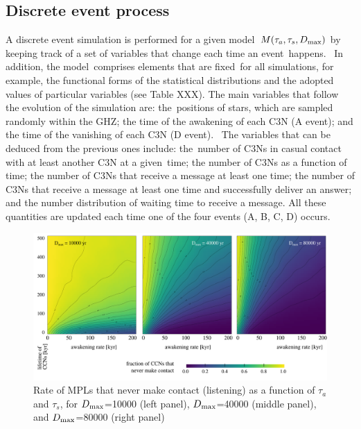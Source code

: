 \documentclass[crop]{CSLB}
\newcommand{\ceti}{C3N}
\newcommand{\cetis}{C3Ns}
\begin{document}
     



\subsection{Discrete event process}

A discrete event simulation is performed for a given model $M(\tau_a,
\tau_s, D_{\rm max})$ by keeping track of a set of variables that change each time an event happens. 
%
In addition, the model comprises elements that are fixed for all simulations, for example, the functional forms of the statistical distributions and the adopted values of particular variables (see Table XXX).
%
The main variables that follow the evolution of the simulation are: the positions of stars, which are sampled randomly within the GHZ; the time of the awakening of each \ceti{} (A event); and the time of the vanishing of each \ceti{} (D event). 
%
The variables that can be deduced from the previous ones include: the number of \cetis{} in casual contact with at least another \ceti{} at a given time; the number of \cetis{} as a function of time; the number of \cetis{} that receive a message at least one time; the number of \cetis{} that receive a message at least one time and successfully deliver an answer; and the number distribution of waiting time to receive a message.
%
All these quantities are updated each time one of the four events (A, B, C, D) occurs.   





          

           
  
\begin{figure} %
   \centering
   \includegraphics[width=\textwidth]{F_never_contact.pdf}
   \caption{
Rate of MPLs that never make contact (listening) as a
function of $\tau_a$ and $\tau_s$, for 
$D_{\rm max}$=10000 (left panel),
$D_{\rm max}$=40000 (middle panel), and
$D_{\rm max}$=80000 (right panel)
%
   }
   \label{F_never_contact}
\end{figure}
 
\end{document}

